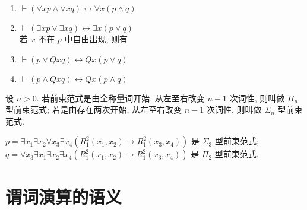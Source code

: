 \documentclass[
    mode=hazy,
    color=blue,
    device=normal,
    lang=cn
]{elegantnote}
\begin{document}
\begin{proposition}
    \hfill
    \begin{enumerate}[label = $\arabic*^\circ$]
        \item $\vdash (\forall x p \land \forall x q)\leftrightarrow \forall x(p\land q)$
        \item $\vdash (\exists x p \lor \exists x q)\leftrightarrow \exists x(p\lor q)$\\
              若 $x$ 不在 $p$ 中自由出现, 则有
        \item $\vdash (p\lor Qxq)\leftrightarrow Qx(p\lor q)$
        \item $\vdash (p\land Qxq)\leftrightarrow Qx(p\land q)$
    \end{enumerate}
\end{proposition}
\begin{definition}
    设 $n>0$. 若前束范式是由全称量词开始, 从左至右改变 $n-1$ 次词性, 则叫做 $\Pi_n$ 型前束范式;
    若是由存在两次开始, 从左至右改变 $n-1$ 次词性, 则叫做 $\Sigma_n$ 型前束范式.
\end{definition}
\begin{example}
    $p = \exists x_1\exists x_2\forall x_3\exists x_4 (R_1^2(x_1, x_2)\to R_1^2(x_3, x_4))$ 是 $\Sigma_3$ 型前束范式;\\
    $q = \forall x_3\exists x_1\exists x_2\exists x_4 (R_1^2(x_1, x_2)\to R_1^2(x_3, x_4))$ 是 $\Pi_2$ 型前束范式.
\end{example}

\newpage
\section{谓词演算的语义}
\end{document}
